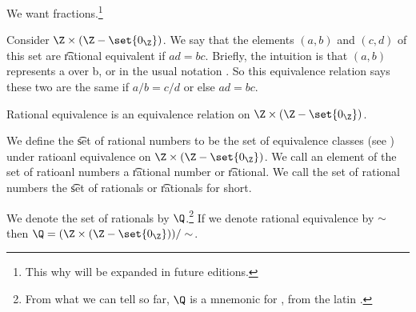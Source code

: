 

We want fractions.\footnote{This why will be expanded in future editions.}


Consider $\Z \times (\Z - \set{0_{\Z}})$.
We say that the elements $(a, b)$ and $(c, d)$ of this set are \t{rational equivalent} if $ad = bc$.
Brieﬂy, the intuition is that $(a, b)$ represents a over b, or in the usual notation .
So this equivalence relation says these two are the same if $a/b = c/d$ or else $ad= bc$.

\begin{proposition}
  Rational equivalence is an equivalence relation on $\Z \times (\Z - \set{0_{\Z}})$.
\end{proposition}

We define the \t{set of rational numbers} to be the set of equivalence classes (see ) under ratioanl equivalence on $\Z \times (\Z - \set{0_{\Z}})$.
We call an element of the set of ratioanl numbers a \t{rational number} or \t{rational}.
We call the set of rational numbers the \t{set of rationals} or \t{rationals} for short.


We denote the set of rationals by $\Q$.\footnote{From what we can tell so far, $\Q$ is a mnemonic for , from the latin .}
If we denote rational equivalence by $\sim$ then $\Q = (\Z \times (\Z - \set{0_{\Z}}))/\sim$.


\blankpage
